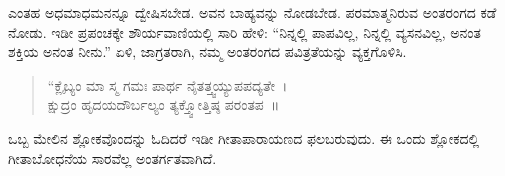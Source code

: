 ಎಂತಹ ಅಧಮಾಧಮನನ್ನೂ ದ್ವೇಷಿಸಬೇಡ. ಅವನ ಬಾಹ್ಯವನ್ನು ನೋಡಬೇಡ. ಪರಮಾತ್ಮನಿರುವ ಅಂತರಂಗದ ಕಡೆ ನೋಡು. ಇಡೀ ಪ್ರಪಂಚಕ್ಕೇ ಶೌರ್ಯವಾಣಿಯಲ್ಲಿ ಸಾರಿ ಹೇಳಿ: “ನಿನ್ನಲ್ಲಿ ಪಾಪವಿಲ್ಲ, ನಿನ್ನಲ್ಲಿ ವ್ಯಸನವಿಲ್ಲ, ಅನಂತ ಶಕ್ತಿಯ ಅನಂತ ನೀನು.” ಏಳಿ, ಜಾಗ್ರತರಾಗಿ, ನಮ್ಮ ಅಂತರಂಗದ ಪವಿತ್ರತೆಯನ್ನು ವ್ಯಕ್ತಗೊಳಿಸಿ.

\begin{verse}
 “ಕ್ಲೈಬ್ಯಂ ಮಾ ಸ್ಮ ಗಮಃ ಪಾರ್ಥ ನೈತತ್ತ್ವಯ್ಯುಪಪದ್ಯತೇ~।\\
 ಕ್ಷುದ್ರಂ ಹೃದಯದೌರ್ಬಲ್ಯಂ ತ್ಯಕ್ತ್ವೋತ್ತಿಷ್ಠ ಪರಂತಪ~॥
\end{verse}

ಒಬ್ಬ ಮೇಲಿನ ಶ್ಲೋಕವೊಂದನ್ನು ಓದಿದರೆ ಇಡೀ ಗೀತಾಪಾರಾಯಣದ ಫಲ\break ಬರುವುದು. ಈ ಒಂದು ಶ್ಲೋಕದಲ್ಲಿ ಗೀತಾಬೋಧನೆಯ ಸಾರವೆಲ್ಲ ಅಂತರ್ಗತವಾಗಿದೆ.

